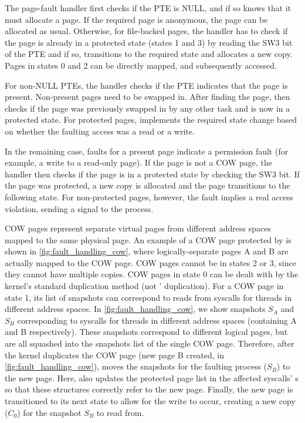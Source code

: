 The page-fault handler first checks if the PTE is NULL, and if so
knows that it must allocate a page.
If the required page is anonymous, the page can be allocated as usual.
Otherwise, for file-backed pages, the handler has to check if the
page is already in a protected state (states 1 and 3) by reading
the SW3 bit of the PTE and if so, transitions to the required state
and allocates a new copy.
Pages in states 0 and 2 can be directly mapped, and subsequently
accessed.

For non-NULL PTEs, the handler checks if the PTE indicates that the
page is present.
Non-present pages need to be swapped in.
After finding the page, \midas then checks if the page was previously
swapped in by any other task and is now in a protected state.
For protected pages, \midas implements the required state change based
on whether the faulting access was a read or a write.

In the remaining case, faults for a present page indicate a
permission fault (for example, a write to a read-only page).
If the page is not a COW page, the handler then checks if the page
is in a protected state by checking the SW3 bit.
If the page was protected, a new copy is allocated and the page
transitions to the following state.
For non-protected pages, however, the fault implies a real access
violation, sending a signal to the process.

COW pages represent separate virtual pages from different
address spaces mapped to the same physical page.
An example of a COW page protected by \midas is shown in
\autoref{fig:fault_handling_cow}, where logically-separate pages A and B
are actually mapped to the COW page.
COW pages cannot be in states 2 or 3, since they cannot have multiple
\midas copies.
COW pages in state 0 can be dealt with by the kernel's standard
duplication method (not \midas' duplication).
For a COW page in state 1, its list of snapshots can correspond to
reads from syscalls for threads in different address spaces.
In \autoref{fig:fault_handling_cow}, we show snapshots $S_A$ and
$S_B$ corresponding to syscalls for threads in different address
spaces (containing A and B respectively).
These snapshots correspond to different logical pages, but are
all squashed into the snapshots list of the single COW page.
Therefore, after the kernel duplicates the COW page (new page
B created, in \autoref{fig:fault_handling_cow}), \midas moves
the snapshots for the faulting process ($S_B$) to the new page.
Here, \midas also updates the protected page list in the
affected syscalls' s so that these structures
correctly refer to the new page.
Finally, the new page is transitioned to its next state to allow
for the write to occur, creating a new copy ($C_0$) for the
snapshot $S_B$ to read from.

